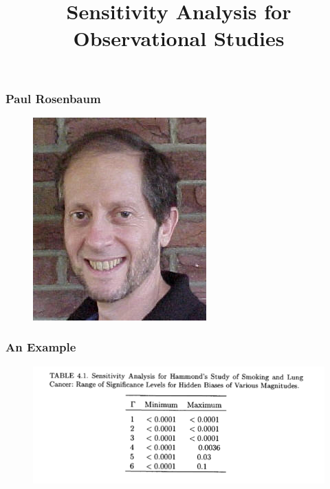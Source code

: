 \documentclass{beamer}
\title{Sensitivity Analysis for Observational Studies}
\begin{document}
\frame{\titlepage}


\begin{frame}
  \frametitle{Paul Rosenbaum}
  \begin{figure}[t]
    \centering
      \includegraphics[scale=.8]{rosenbaum.jpg}
 \end{figure}
\end{frame}




\begin{frame}
  \frametitle{An Example}
  \begin{figure}[t]
  \centering
  \includegraphics[scale=.6]{smoking_sensitivity.png}
\end{figure}
\end{frame}
\end{document}

